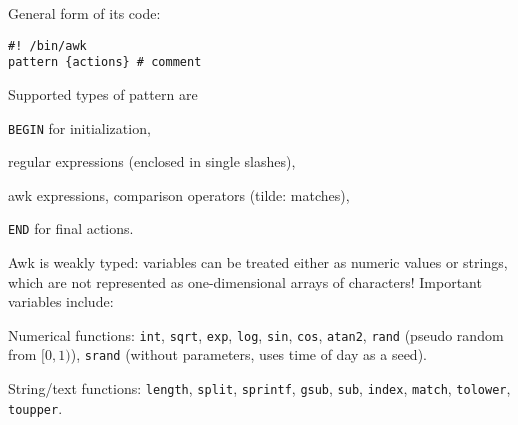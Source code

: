 General form of its code:
\begin{verbatim}
#! /bin/awk
pattern {actions} # comment
\end{verbatim}

Supported types of pattern are
\begin{compactenum}
\item \texttt{BEGIN} for initialization,
\item regular expressions (enclosed in single slashes),
\item awk expressions, comparison operators (tilde: matches),
\item \texttt{END} for final actions.
\end{compactenum}

Awk is weakly typed: variables can be treated either as numeric values or strings, which are not represented as one-dimensional arrays of characters!
Important variables include:

Numerical functions: \texttt{int}, \texttt{sqrt}, \texttt{exp}, \texttt{log}, \texttt{sin}, \texttt{cos}, \texttt{atan2}, \texttt{rand} (pseudo random from $[0, 1)$), \texttt{srand} (without parameters, uses time of day as a seed).

String/text functions: \texttt{length}, \texttt{split}, \texttt{sprintf}, \texttt{gsub}, \texttt{sub}, \texttt{index}, \texttt{match}, \texttt{tolower}, \texttt{toupper}.
